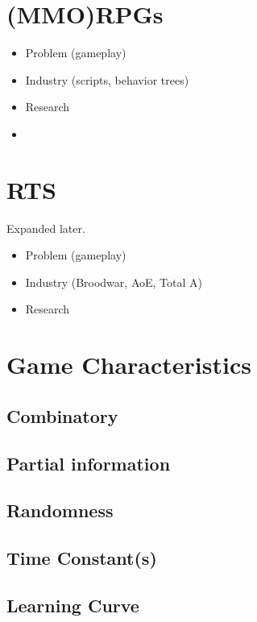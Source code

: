 \section{(MMO)RPGs}
\begin{itemize}
\item Problem (gameplay)
\item Industry (scripts, behavior trees)
\item Research \citep{Cutumisu09}
\item \citep{SYNNAEVE:MMORPG}
\end{itemize}

\section{RTS}
Expanded later.
\begin{itemize}
\item Problem (gameplay)
\item Industry (Broodwar, AoE, Total A)
\item Research
\end{itemize}

\section{Game Characteristics}
\subsection{Combinatory}
\subsection{Partial information}
\subsection{Randomness}
\subsection{Time Constant(s)}
\subsection{Learning Curve}
